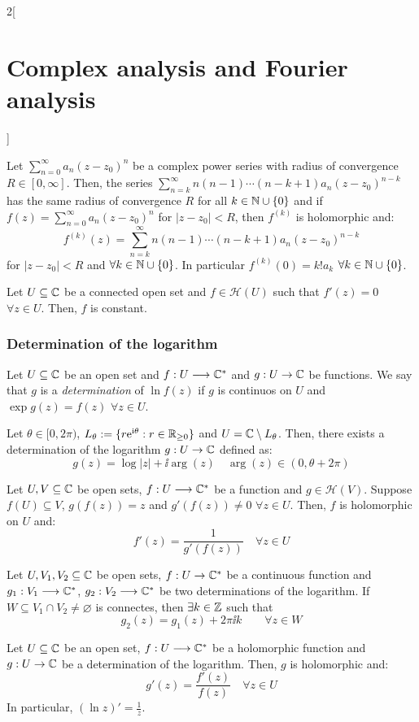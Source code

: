 \documentclass[../../../main.tex]{subfiles}
\begin{document}
\begin{multicols}{2}[\section{Complex analysis and Fourier analysis}]
\begin{theorem}
  \end{theorem}
  \begin{corollary}
    Let $\sum_{n=0}^\infty a_n{(z-z_0)}^n$ be a complex power series with radius of convergence $R\in[0,\infty]$. Then, the series $\sum_{n=k}^\infty n(n-1)\cdots(n-k+1)a_n{(z-z_0)}^{n-k}$ has the same radius of convergence $R$ for all $k\in\mathbb{N} \cup\{0\}$ and if $f(z)=\sum_{n=0}^\infty a_n{(z-z_0)}^n$ for $|z-z_0|<R$, then $f^{(k)}$ is holomorphic and: $$f^{(k)}(z)=\sum_{n=k}^\infty n(n-1)\cdots(n-k+1)a_n{(z-z_0)}^{n-k}$$ for $|z-z_0|<R$ and $\forall k\in\mathbb{N} \cup\{0\}$. In particular $f^{(k)}(0)=k!a_k$ $\forall k\in\mathbb{N}\cup\{0\}$.
  \end{corollary}
  \begin{proposition}
    Let $U\subseteq\mathbb{C}$ be a connected open set and $f\in\mathcal{H}(U)$ such that $f'(z)=0$ $\forall z\in U$. Then, $f$ is constant.
  \end{proposition}
  \subsubsection{Determination of the logarithm}
  \begin{definition}
    Let $U\subseteq\mathbb{C}$ be an open set and $f:U\longrightarrow\mathbb{C}^*$ and $g:U\rightarrow\mathbb{C}$ be functions. We say that $g$ is a \emph{determination} of $\ln f(z)$ if $g$ is continuos on $U$ and $\exp{g(z)}=f(z)$ $\forall z\in U$.
  \end{definition}
  \begin{proposition}
    Let $\theta\in[0,2\pi)$, $L_\theta:=\{r\mathrm{e}^{\mathrm{i}\theta}:r\in\mathbb{R}_{\geq 0}\}$ and $U=\mathbb{C}\setminus L_\theta$. Then, there exists a determination of the logarithm $g:U\rightarrow\mathbb{C}$ defined as:
    $$g(z)=\log |z|+\ii\arg(z)\quad\arg(z)\in(0,\theta+2\pi)$$
  \end{proposition}
  \begin{theorem}
    Let $U,V\subseteq\mathbb{C}$ be open sets, $f:U\longrightarrow\mathbb{C}^*$ be a function and $g\in\mathcal{H}(V)$. Suppose $f(U)\subseteq V$, $g(f(z))=z$ and $g'(f(z))\ne 0$ $\forall z\in U$. Then, $f$ is holomorphic on $U$ and: $$f'(z)=\frac{1}{g'(f(z))}\quad\forall z\in U$$
  \end{theorem}
  \begin{proposition}
    Let $U,V_1,V_2\subseteq\mathbb{C}$ be open sets, $f:U\rightarrow\mathbb{C}^*$ be a continuous function and $g_1:V_1\longrightarrow\mathbb{C}^*$, $g_2:V_2\longrightarrow\mathbb{C}^*$ be two determinations of the logarithm. If $W\subseteq V_1\cap V_2\ne\varnothing$ is connectes, then $\exists k\in\mathbb{Z}$ such that $$g_2(z)=g_1(z)+2\pi \ii k\qquad\forall z\in W$$
  \end{proposition}
  \begin{corollary}
    Let $U\subseteq\mathbb{C}$ be an open set, $f:U\longrightarrow\mathbb{C}^*$ be a holomorphic function and $g:U\rightarrow\mathbb{C}$ be a determination of the logarithm. Then, $g$ is holomorphic and: $$g'(z)=\frac{f'(z)}{f(z)}\quad \forall z\in U$$
    In particular, ${\left(\ln z\right)}'=\frac{1}{z}$.
  \end{corollary}

\end{multicols}
\end{document}
